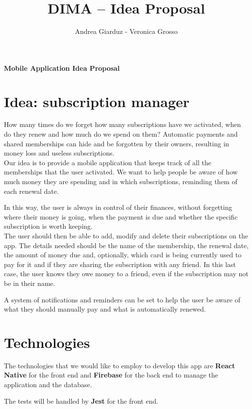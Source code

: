 \documentclass[11pt]{article}
\title{DIMA -- Idea Proposal}
\author{Andrea Giarduz - Veronica Grosso}
\begin{document}
\begin{center}
    \LARGE{\textbf{Mobile Application Idea Proposal}}
\end{center}

\section{Idea: subscription manager}
How many times do we forget how many subscriptions have we activated, when do they renew and how much do we spend on them? Automatic payments and shared memberships can hide and be forgotten by their owners, resulting in money loss and useless subscriptions.
\\

Our idea is to provide a mobile application that keeps track of all the memberships that the user activated. We want to help people be aware of how much money they are spending and in which subscriptions, reminding them of each renewal date.

In this way, the user is always in control of their finances, without forgetting where their money is going, when the payment is due and whether the specific subscription is worth keeping. \\

The user should then be able to add, modify and delete their subscriptions on the app. The details needed should be the name of the membership, the renewal date, the amount of money due and, optionally, which card is being currently used to pay for it and if they are sharing the subscription with any friend. In this last case, the user knows they owe money to a friend, even if the subscription may not be in their name.

A system of notifications and reminders can be set to help the user be aware of what they should manually pay and what is automatically renewed.

\section{Technologies}
The technologies that we would like to employ to develop this app are \textbf{React Native} for the front end and \textbf{Firebase} for the back end to manage the application and the database.

The tests will be handled by \textbf{Jest} for the front end.
\end{document}
